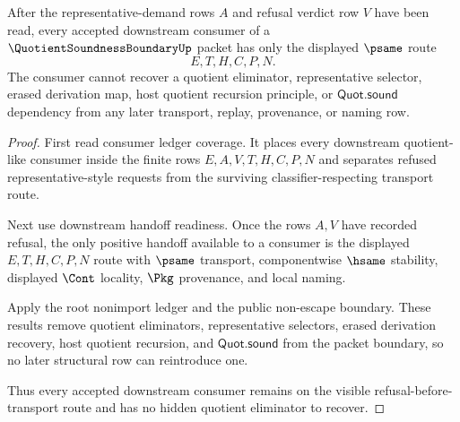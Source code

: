 \begin{theorem}
\label{thm:quotient-soundness-boundary-no-hidden-eliminator}
After the representative-demand rows $A$ and refusal verdict row $V$ have been read, every accepted downstream consumer of a $\QuotientSoundnessBoundaryUp$ packet has only the displayed $\psame$ route
$$
E,T,H,C,P,N.
$$
The consumer cannot recover a quotient eliminator, representative selector, erased derivation map, host quotient recursion principle, or $\mathsf{Quot.sound}$ dependency from any later transport, replay, provenance, or naming row.
\end{theorem}
\begin{proof}
First read consumer ledger coverage. It places every downstream quotient-like consumer inside the finite rows $E,A,V,T,H,C,P,N$ and separates refused representative-style requests from the surviving classifier-respecting transport route.

Next use downstream handoff readiness. Once the rows $A,V$ have recorded refusal, the only positive handoff available to a consumer is the displayed $E,T,H,C,P,N$ route with $\psame$ transport, componentwise $\hsame$ stability, displayed $\Cont$ locality, $\Pkg$ provenance, and local naming.

Apply the root nonimport ledger and the public non-escape boundary. These results remove quotient eliminators, representative selectors, erased derivation recovery, host quotient recursion, and $\mathsf{Quot.sound}$ from the packet boundary, so no later structural row can reintroduce one.

Thus every accepted downstream consumer remains on the visible refusal-before-transport route and has no hidden quotient eliminator to recover.
\end{proof}

